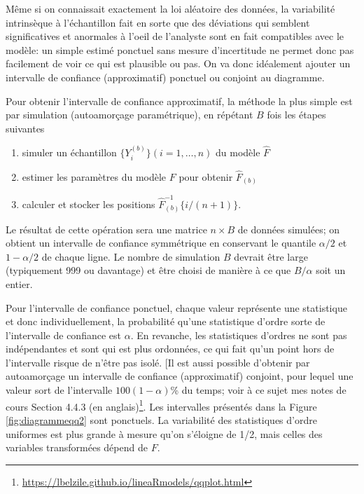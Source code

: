 \documentclass[
  11pt,
  letterpaper,
]{article}
\providecommand{\tightlist}{%
  \setlength{\itemsep}{0pt}\setlength{\parskip}{0pt}}
\renewcommand{\href}[2]{#2\footnote{\url{#1}}}
\theoremstyle{definition}
\theoremstyle{definition}
\theoremstyle{definition}
\theoremstyle{definition}
\theoremstyle{remark}
\begin{document}
Même si on connaissait exactement la loi aléatoire des données, la variabilité intrinsèque à l'échantillon fait en sorte que des déviations qui semblent significatives et anormales à l'oeil de l'analyste sont en fait compatibles avec le modèle: un simple estimé ponctuel sans mesure d'incertitude ne permet donc pas facilement de voir ce qui est plausible ou pas. On va donc idéalement ajouter un intervalle de confiance (approximatif) ponctuel ou conjoint au diagramme.

Pour obtenir l'intervalle de confiance approximatif, la méthode la plus simple est par simulation (autoamorçage paramétrique), en répétant \(B\) fois les étapes suivantes

\begin{enumerate}
\def\labelenumi{\arabic{enumi}.}
\tightlist
\item
  simuler un échantillon \(\{Y^{(b)}_{i}\} (i=1,\ldots, n)\) du modèle \(\widehat{F}\)
\item
  estimer les paramètres du modèle \(F\) pour obtenir \(\widehat{F}_{(b)}\)
\item
  calculer et stocker les positions \(\widehat{F}^{-1}_{(b)}\{i/(n+1)\}\).
\end{enumerate}

Le résultat de cette opération sera une matrice \(n \times B\) de données simulées; on obtient un intervalle de confiance symmétrique en conservant le quantile \(\alpha/2\) et \(1-\alpha/2\) de chaque ligne. Le nombre de simulation \(B\) devrait être large (typiquement 999 ou davantage) et être choisi de manière à ce que \(B/\alpha\) soit un entier.

Pour l'intervalle de confiance ponctuel, chaque valeur représente une statistique et donc individuellement, la probabilité qu'une statistique d'ordre sorte de l'intervalle de confiance est \(\alpha\). En revanche, les statistiques d'ordres ne sont pas indépendantes et sont qui est plus ordonnées, ce qui fait qu'un point hors de l'intervalle risque de n'être pas isolé. {[}Il est aussi possible d'obtenir par autoamorçage un intervalle de confiance (approximatif) conjoint, pour lequel une valeur sort de l'intervalle \(100(1-\alpha)\)\% du temps; \href{https://lbelzile.github.io/lineaRmodels/qqplot.html}{voir à ce sujet mes notes de cours Section 4.4.3 (en anglais)}. Les intervalles présentés dans la Figure \ref{fig:diagrammeqq2} sont ponctuels. La variabilité des statistiques d'ordre uniformes est plus grande à mesure qu'on s'éloigne de 1/2, mais celles des variables transformées dépend de \(F\).
\end{document}
